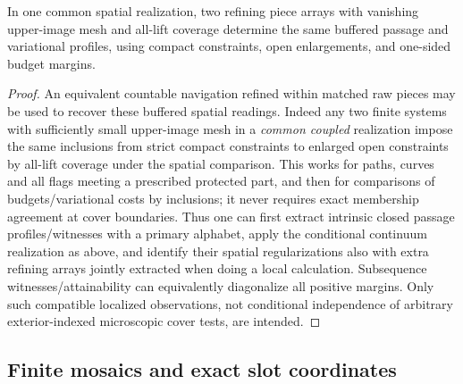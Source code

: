 \begin{lemma}\label{kern:equivalent-arrays}
In one common spatial realization, two refining piece arrays with vanishing upper-image mesh
and all-lift coverage determine the same buffered passage and variational profiles, using compact
constraints, open enlargements, and one-sided budget margins.
\end{lemma}
\begin{proof}

An equivalent countable navigation refined within matched raw pieces may be used to recover these buffered
spatial readings. Indeed any two finite systems with sufficiently small upper-image mesh in a \emph{common
coupled} realization impose the same inclusions from strict compact constraints to enlarged open constraints
by all-lift coverage under the spatial comparison. This works for paths, curves and all flags meeting a
prescribed protected part, and then for comparisons of budgets/variational costs by inclusions; it never
requires exact membership agreement at cover boundaries. Thus one can first extract intrinsic closed passage
profiles/witnesses with a primary alphabet, apply the conditional continuum realization as above, and
identify their spatial regularizations also with extra refining arrays jointly extracted when doing a local
calculation. Subsequence witnesses/attainability can equivalently diagonalize all positive margins. Only
such compatible localized observations, not conditional independence of arbitrary exterior-indexed
microscopic cover tests, are intended.

\end{proof}

\subsection{Finite mosaics and exact slot coordinates}

